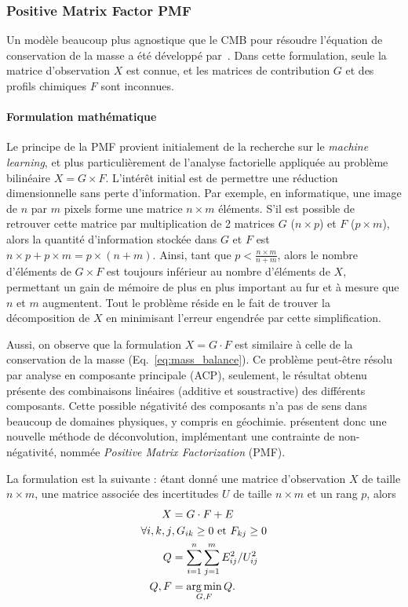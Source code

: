 \subsubsection{Positive Matrix Factor PMF}%
\label{ssub:pmf}

Un modèle beaucoup plus agnostique que le CMB pour résoudre l'équation de conservation de
la masse a été développé par~\cite{paateroPositive1994}. Dans cette formulation,
seule la matrice d'observation $X$ est connue, et les matrices de contribution $G$ et des
profils chimiques $F$ sont inconnues.

\paragraph{Formulation mathématique}%
\label{par:formulation_mathématique}

Le principe de la PMF provient initialement de la recherche sur le \textit{machine
learning}, et plus particulièrement de l'analyse factorielle appliquée au problème
bilinéaire $X=G\times F$. L'intérêt initial est de permettre une réduction
dimensionnelle sans perte d'information. Par exemple, en informatique, une image de $n$
par $m$ pixels forme une matrice $n\times m$ éléments. S'il est possible de retrouver
cette matrice par multiplication de 2 matrices $G$ ($n\times p$) et $F$ ($p \times m$),
alors la quantité d'information stockée dans $G$ et $F$ est $n
\times p + p \times m = p \times (n + m)$. Ainsi, tant que $p < \frac{n\times m}{n+m}$,
alors le nombre d'éléments de $G\times F$ est toujours inférieur au nombre d'éléments de
$X$, permettant un gain de mémoire de plus en plus important au fur et à mesure que $n$ et
$m$ augmentent.
Tout le problème réside en le fait de trouver la décomposition de $X$ en minimisant
l'erreur engendrée par cette simplification.

Aussi, on observe que la formulation $X = G\cdot F$ est similaire à celle de
la conservation de la masse (Eq.~\ref{eq:mass_balance}). Ce problème peut-être résolu par
analyse en composante principale (ACP), seulement, le résultat obtenu présente des
combinaisons linéaires (additive et soustractive) des différents composants. Cette possible
négativité des composants n'a pas de sens dans beaucoup de domaines physiques, y compris en
géochimie. \cite{paateroPositive1994} présentent donc une nouvelle méthode de
déconvolution, implémentant une contrainte de non-négativité, nommée \textit{Positive Matrix
Factorization} (PMF). 

La formulation est la suivante : étant donné une matrice d'observation $X$ de taille
$n\times m$, une matrice associée des incertitudes $U$ de taille $n \times m$ et un rang
$p$, alors 
\begin{align}
    \label{eq:pmf_formulation}
    X &= G \cdot F + E \\
    \forall i,k,j &, G_{ik}\geq 0 \text{ et } F_{kj}\geq 0\\
    Q &= \sum_{i=1}^n\sum_{j=1}^m E_{ij}^2/U_{ij}^2\label{eq:Qfunction}\\
    {Q, F} &= \operatorname*{arg\,min}_{G,F} Q.
\end{align}

